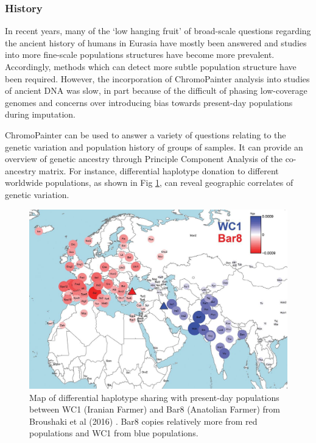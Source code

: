 \subsubsection{History}

In recent years, many of the `low hanging fruit' of broad-scale questions regarding the ancient history of humans in Eurasia have mostly been answered and studies into more fine-scale populations structures have become more prevalent. Accordingly, methods which can detect more subtle population structure have been required. However, the incorporation of ChromoPainter analysis into studies of ancient DNA was slow, in part because of the difficult of phasing low-coverage genomes and concerns over introducing bias towards present-day populations during imputation. 

ChromoPainter can be used to answer a variety of questions relating to the genetic variation and population history of groups of samples. It can provide an overview of genetic ancestry through Principle Component Analysis of the co-ancestry matrix. For instance, differential haplotype donation to different worldwide populations, as shown in Fig \ref{fig:broushaki_haplotype_sharing}, can reveal geographic correlates of genetic variation. 

\begin{figure}[htp]
    \centering
    \includegraphics[width=1.0\textwidth]{../images/introduction/broushaki_haplotype_sharing.jpg}
    \caption{Map of differential haplotype sharing with present-day populations between WC1 (Iranian Farmer) and Bar8 (Anatolian Farmer) from Broushaki et al (2016) \cite{Broushaki2016a}. Bar8 copies relatively more from red populations and WC1 from blue populations.}
    \label{fig:broushaki_haplotype_sharing}
\end{figure}


